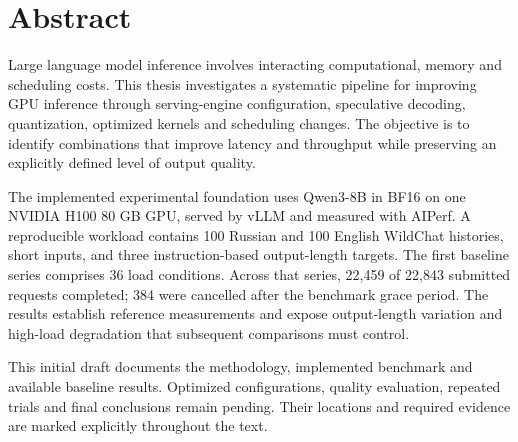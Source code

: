 \chapter*{Abstract}
Large language model inference involves interacting computational, memory and scheduling costs. This thesis investigates a systematic pipeline for improving GPU inference through serving-engine configuration, speculative decoding, quantization, optimized kernels and scheduling changes. The objective is to identify combinations that improve latency and throughput while preserving an explicitly defined level of output quality.

The implemented experimental foundation uses Qwen3-8B in BF16 on one NVIDIA H100 80 GB GPU, served by vLLM and measured with AIPerf. A reproducible workload contains 100 Russian and 100 English WildChat histories, short inputs, and three instruction-based output-length targets. The first baseline series comprises 36 load conditions. Across that series, 22,459 of 22,843 submitted requests completed; 384 were cancelled after the benchmark grace period. The results establish reference measurements and expose output-length variation and high-load degradation that subsequent comparisons must control.

This initial draft documents the methodology, implemented benchmark and available baseline results. Optimized configurations, quality evaluation, repeated trials and final conclusions remain pending. Their locations and required evidence are marked explicitly throughout the text.
